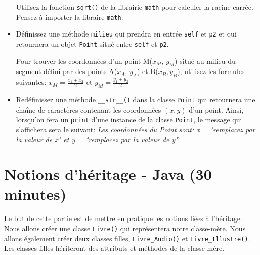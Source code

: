 \begin{Exercice}[15 minutes]
\begin{itemize}
\begin{conseil}
            Utilisez la fonction \lstinline{sqrt()} de la librairie \lstinline{math} pour calculer la racine carrée. Pensez à importer la libraire \lstinline{math}.
        \end{conseil}
        \item Définissez une méthode \lstinline{milieu} qui prendra en entrée \lstinline{self} et \lstinline{p2} et qui retournera un objet \lstinline{Point} situé entre \lstinline{self} et \lstinline{p2}.
        \begin{conseil}
            Pour trouver les coordonnées d'un point M($x_M$, $y_M$) situé au milieu du segment défini par des points A($x_A$, $y_A$) et B($x_B, y_B$),
            utilisez les formules suivantes:
            $x_M = \frac{x_1 + x_2}{2}$ et $y_M = \frac{y_1 + y_2}{2}$
        \end{conseil}
        \item Redéfinissez une méthode \lstinline{__str__()} dans la classe \lstinline{Point} qui retournera une chaîne de caractères contenant les coordonnées $(x,y)$ d'un point. Ainsi, lorsqu'on fera un \lstinline{print} d'une instance de la classe \lstinline{Point}, le message qui s'affichera sera le suivant:
        \textit{Les coordonnées du Point sont: x = "remplacez par la valeur de x" et y = "remplacez par la valeur de y"}
    \end{itemize}
\end{Exercice}
\begin{solution}
    
\end{solution}

\newpage

\section{Notions d'héritage - Java (30 minutes)}

Le but de cette partie est de mettre en pratique les notions liées à l'héritage. 
Nous allons créer une classe \lstinline{Livre()} qui représentera notre classe-mère. Nous allons également créer deux classes filles, \lstinline{Livre_Audio()} et \lstinline{Livre_Illustre()}. Les classes filles hériteront des attributs et méthodes de la classe-mère. \\

